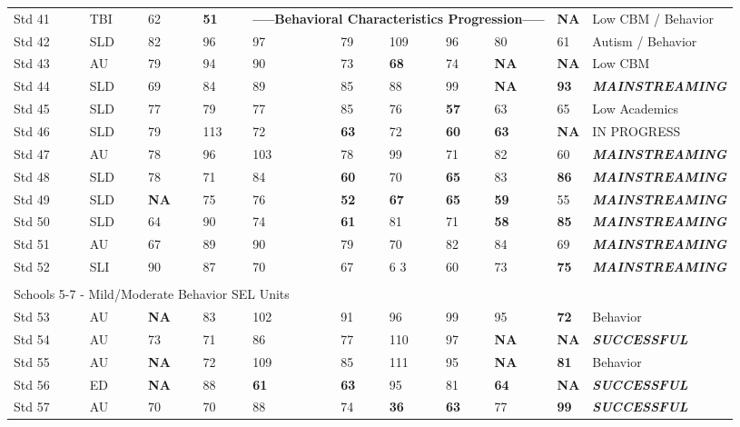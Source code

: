 \documentclass[twoside]{article}
\begin{document}
\begin{tiny}
\begin{landscape}
\begin{longtable}{p{1.5cm}p{1.5cm}p{1.5cm}p{1.5cm}p{1.75cm}p{1.75cm}p{1.75cm}p{1.75cm}p{1.75cm}p{1.75cm}p{2.5cm}@{}}
Std 41 & TBI & 62 & \textbf{51} & \multicolumn{5}{c}{\textbf{-----Behavioral Characteristics Progression-----}} & \textbf{NA} & Low CBM / Behavior\\
Std 42 & SLD & 82 & 96 & 97 & 79 & 109 & 96 & 80 & 61 & Autism / Behavior\\
Std 43 & AU & 79 & 94 & 90 &73 & \textbf{68} & 74 & \textbf{NA} & \textbf{NA} & Low CBM\\
Std 44 & SLD & 69 & 84 & 89 & 85 & 88 & 99 & \textbf{NA} & \textbf{93} & \textbf{\textit{MAINSTREAMING}}\\ 
Std 45 & SLD & 77 & 79 & 77 & 85 & 76& \textbf{57} & 63 & 65 & Low Academics\\
Std 46 & SLD & 79 & 113 & 72 & \textbf{63} & 72 & \textbf{60} & \textbf{63} & \textbf{NA} & IN PROGRESS\\ 
Std 47 & AU & 78 & 96 & 103 & 78 & 99 & 71 & 82 & 60 &  \textbf{\textit{MAINSTREAMING}} \\
Std 48 & SLD & 78 & 71 & 84 & \textbf{60} & 70 & \textbf{65} & 83 & \textbf{86} &  \textbf{\textit{MAINSTREAMING}} \\
Std 49 & SLD & \textbf{NA} & 75 & 76 & \textbf{52} & \textbf{67} & \textbf{65} & \textbf{59} & 55 &  \textbf{\textit{MAINSTREAMING}} \\
Std 50 & SLD & 64 & 90 & 74 & \textbf{61} & 81 & 71 & \textbf{58} & \textbf{85} &  \textbf{\textit{MAINSTREAMING}} \\
Std 51 & AU & 67 & 89 & 90 & 79 & 70 & 82 & 84 & 69 &   \textbf{\textit{MAINSTREAMING}} \\
Std 52 & SLI & 90 & 87 & 70 & 67 & 6 3& 60 & 73 & \textbf{75} &  \textbf{\textit{MAINSTREAMING}} \\
\hline\\
%
\multicolumn {5}{l}{Schools 5-7 - Mild/Moderate Behavior SEL Units} & & & & & &\\
\cmidrule(lr){1-2}
Std 53 & AU & \textbf{NA} & 83 & 102 & 91 & 96 & 99 & 95 & \textbf{72} & Behavior\\
Std 54 & AU & 73 & 71 & 86 & 77 & 110 & 97 & \textbf{NA} & \textbf{NA} & \textbf{\textit{SUCCESSFUL}} \\
Std 55 & AU & \textbf{NA} & 72 & 109 & 85 & 111 & 95 & \textbf{NA} & \textbf{81} & Behavior \\
Std 56 & ED & \textbf{NA} & 88 & \textbf{61} & \textbf{63} & 95 & 81 & \textbf{64} & \textbf{NA} & \textbf{\textit{SUCCESSFUL}} \\
Std 57 & AU & 70 & 70 & 88 & 74 & \textbf{36} & \textbf{63} & 77 & \textbf{99} & \textbf{\textit{SUCCESSFUL}} \\

\end{longtable}
\end{landscape}
\end{tiny}
\end{document}
